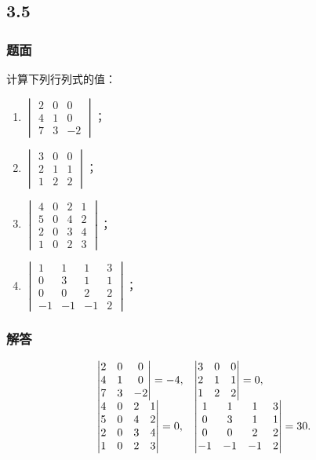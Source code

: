\documentclass[10pt,xcolor=svgnames]{beamer} %
\begin{document}
\subsection*{3.5}
\begin{frame}
    \frametitle{题面}
    计算下列行列式的值：
    \begin{enumerate}
        \item \(\begin{vmatrix}2&0&0\\4&1&0\\7&3&-2\end{vmatrix}\)；
        \item \(\begin{vmatrix}3&0&0\\2&1&1\\1&2&2\end{vmatrix}\)；
        \item \(\begin{vmatrix}4&0&2&1\\5&0&4&2\\2&0&3&4\\1&0&2&3\end{vmatrix}\)；
        \item \(\begin{vmatrix}1&1&1&3\\0&3&1&1\\0&0&2&2\\-1&-1&-1&2\end{vmatrix}\)；
    \end{enumerate}
\end{frame}
\begin{frame}
    \frametitle{解答}
    \begin{equation*}
        \begin{array}[2]{ll}
            \begin{vmatrix}2&0&0\\4&1&0\\7&3&-2\end{vmatrix}=-4,              & \begin{vmatrix}3&0&0\\2&1&1\\1&2&2\end{vmatrix}=0,                    \\
            \begin{vmatrix}4&0&2&1\\5&0&4&2\\2&0&3&4\\1&0&2&3\end{vmatrix}=0, & \begin{vmatrix}1&1&1&3\\0&3&1&1\\0&0&2&2\\-1&-1&-1&2\end{vmatrix}=30.
        \end{array}
    \end{equation*}
\end{frame}
\end{document}
